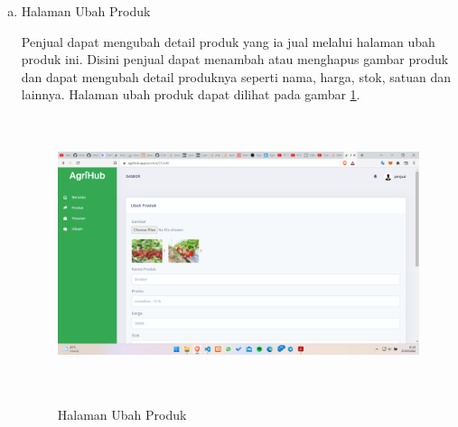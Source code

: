 \begin{enumerate}
\begin{enumerate}[a.]
		\item Halaman Ubah Produk
		\par Penjual dapat mengubah detail produk yang ia jual melalui halaman ubah produk ini. Disini penjual dapat menambah atau menghapus gambar produk dan dapat mengubah detail produknya seperti nama, harga, stok, satuan dan lainnya. Halaman ubah produk dapat dilihat pada gambar \ref*{ubah_produk}.
		\begin{figure}[H]
			\centering
			{\includegraphics [width = 13.3cm, height= 8cm]{gambar/penjual/ubah_produk}}
			\caption{Halaman Ubah Produk}
			\label{ubah_produk}
		\end{figure}


\end{enumerate}
\end{enumerate}
